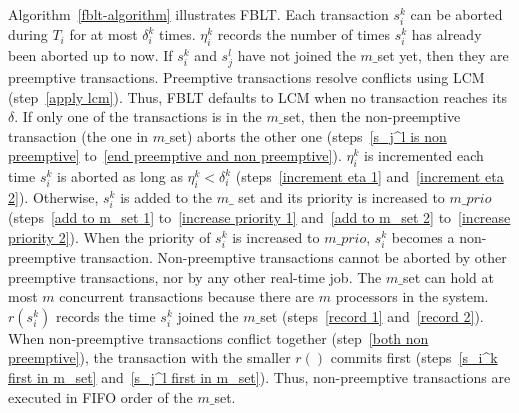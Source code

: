\documentclass[conference]{IEEEtran}
\begin{document}
Algorithm~\ref{fblt-algorithm} illustrates FBLT. Each transaction $s_{i}^{k}$ can be aborted during $T_i$ for at most $\delta_{i}^{k}$ times. $\eta_{i}^{k}$ records  the number of times $s_{i}^{k}$ has already been aborted up to now. If $s_i^k$ and $s_j^l$ have not joined the $m\_$set yet, then they are preemptive transactions. Preemptive transactions resolve conflicts using LCM~\cite{lcmdac2012} (step~\ref{apply lcm}). Thus, FBLT defaults to LCM when no transaction reaches its $\delta$. If only one of the transactions is in the $m\_$set, then the non-preemptive transaction (the one in $m\_$set) aborts the other one (steps~\ref{s_j^l is non preemptive} to~\ref{end preemptive and non preemptive}). $\eta_i^k$ is incremented each time $s_i^k$ is aborted as long as $\eta_i^k < \delta_i^k$ (steps~\ref{increment eta 1} and~\ref{increment eta 2}). Otherwise, $s_i^k$ is added to the $m\_$ set and its priority is increased to $m\_prio$ (steps~\ref{add to m_set 1} to~\ref{increase priority 1} and~\ref{add to m_set 2} to~\ref{increase priority 2}). When the priority of $s_i^k$ is increased to $m\_prio$, $s_i^k$ becomes a non-preemptive transaction. Non-preemptive transactions cannot be aborted by other preemptive transactions, nor by any other real-time job. The $m\_$set can hold at most $m$ concurrent transactions because there are $m$ processors in the system. $r(s_i^k)$ records the time $s_i^k$ joined the $m\_$set (steps~\ref{record 1} and~\ref{record 2}). When non-preemptive transactions conflict together (step~\ref{both non preemptive}), the transaction with the smaller $r()$ commits first (steps~\ref{s_i^k first in m_set} and~\ref{s_j^l first in m_set}). Thus, non-preemptive transactions are executed in FIFO order of the $m\_$set.
\end{document}
